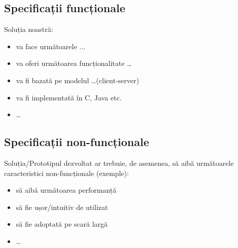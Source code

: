 \subsection{Specificații funcționale}

Soluția noastră:
\begin{itemize}
  \item va face următoarele ...
  \item va oferi următoarea funcționalitate \dots
  \item va fi bazată pe modelul \dots (client-server) 
  \item va fi implementată în C, Java etc.
  \item \dots
\end{itemize}


\subsection{Specificații non-funcționale}

Soluția/Prototipul dezvoltat ar trebuie, de asemenea, să aibă următoarele caracteristici non-funcționale (exemple):
\begin{itemize}
  \item să aibă următoarea performanță
  \item să fie ușor/intuitiv de utilizat
  \item să fie adoptată pe scară largă 
  \item \dots
\end{itemize}




